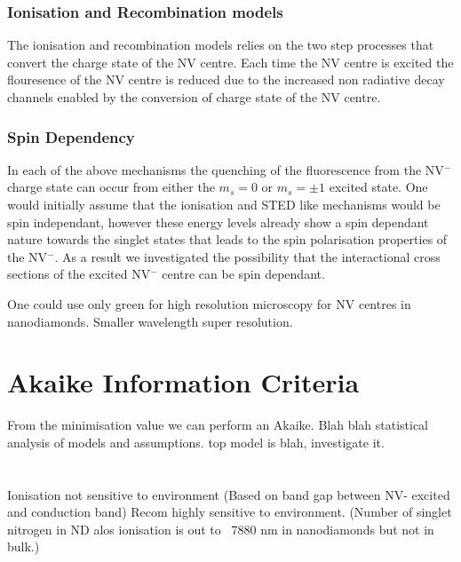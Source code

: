 \documentclass[prl]{revtex4}
\begin{document}
\subsubsection{Ionisation and Recombination models}
The ionisation and recombination models relies on the two step processes that convert the charge state of the NV centre. Each time the NV centre is excited the flouresence of the NV centre is reduced due to the increased non radiative decay channels enabled by the conversion of charge state of the NV centre.

\subsubsection{Spin Dependency}
In each of the above mechanisms the quenching of the fluorescence from the NV$^-$ charge state can occur from either the $m_s=0$ or $m_s=\pm1$ excited state. One would initially assume that the ionisation and STED like mechanisms would be spin independant, however these energy levels already show a spin dependant nature towards the singlet states that leads to the spin polarisation properties of the NV$^-$. As a result we investigated the possibility that the interactional cross sections of the excited NV$^-$ centre can be spin dependant.


One could use only green for high resolution microscopy for NV centres in nanodiamonds. Smaller wavelength super resolution.

\section{Akaike Information Criteria}
From the minimisation value we can perform an Akaike.
Blah blah statistical analysis of models and assumptions.
top model is blah, investigate it.
%

\section{}
Ionisation not sensitive to environment (Based on band gap between NV- excited and conduction band)
Recom highly sensitive to environment. (Number of singlet nitrogen in ND alos ionisation is out to ~7880 nm in nanodiamonds but not in bulk.)




\begin{thebibliography}{27}






\end{thebibliography}
\end{document}
